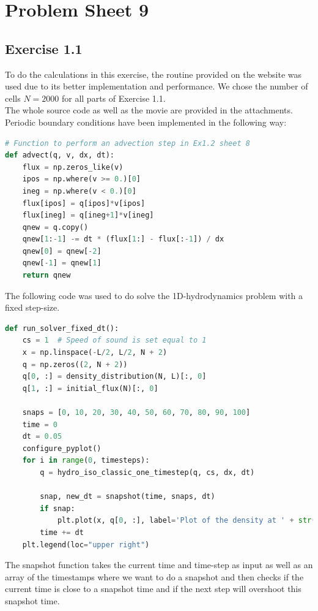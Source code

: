 \documentclass{scrartcl}
\begin{document}
\section*{Problem Sheet 9}
\subsection*{Exercise 1.1}
To do the calculations in this exercise, the routine provided on the website was used due to its better implementation and performance. 
We chose the number of cells \( N = 2000 \) for all parts of Exercise 1.1.\\
The whole source code as well as the movie are provided in the attachments.
Periodic boundary conditions have been implemented in the following way:

\begin{lstlisting}[title=Modification of the advect() function with periodic boundary conditions.,  language=Python, frame=single]
# Function to perform an advection step in Ex1.2 sheet 8
def advect(q, v, dx, dt):
	flux = np.zeros_like(v)
	ipos = np.where(v >= 0.)[0]
	ineg = np.where(v < 0.)[0]
	flux[ipos] = q[ipos]*v[ipos]
	flux[ineg] = q[ineg+1]*v[ineg]
	qnew = q.copy()
	qnew[1:-1] -= dt * (flux[1:] - flux[:-1]) / dx
	qnew[0] = qnew[-2]
	qnew[-1] = qnew[1]
	return qnew
\end{lstlisting}
The following code was used to do solve the 1D-hydrodynamics problem with a fixed step-size.
\begin{lstlisting}[title=Symmetric numerical derivative code.,  language=Python, frame=single]
def run_solver_fixed_dt():
	cs = 1  # Speed of sound is set equal to 1
	x = np.linspace(-L/2, L/2, N + 2)
	q = np.zeros((2, N + 2))
	q[0, :] = density_distribution(N, L)[:, 0]
	q[1, :] = initial_flux(N)[:, 0]
	
	snaps = [0, 10, 20, 30, 40, 50, 60, 70, 80, 90, 100]
	time = 0
	dt = 0.05
	configure_pyplot()
	for i in range(0, timesteps):
		q = hydro_iso_classic_one_timestep(q, cs, dx, dt)
		
		snap, new_dt = snapshot(time, snaps, dt)
		if snap:
			plt.plot(x, q[0, :], label='Plot of the density at ' + str(time + new_dt) + ' s')
		time += dt
	plt.legend(loc="upper right")

\end{lstlisting}
The snapshot function takes the current time and time-step as input as well as an array of the timestamps where we want to do a snapshot and then checks if the current time is close to a snapshot time and if the next step will overshoot this snapshot time. 
\end{document}
